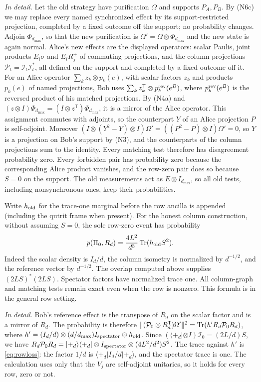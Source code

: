\emph{In detail.} Let the old strategy have purification $\Omega$ and supports $P_A,P_B$. By (N6c) we may replace every named synchronized effect by its support-restricted projection, completed by a fixed outcome off the support; no probability changes. Adjoin $\Phi_{d_{\max}}$, so that the new purification is $\Omega'=\Omega\otimes\Phi_{d_{\max}}$ and the new state is again normal. Alice's new effects are the displayed operators: scalar Paulis, joint products $E_i\sigma$ and $E_iR^\pm_j$ of commuting projections, and the column projections $\mathcal P_t=\mathcal I_t\mathcal I_t^*$, all defined on the support and completed by a fixed outcome off it. For an Alice operator $\sum_kz_k\otimes p_k(e)$, with scalar factors $z_k$ and products $p_k(e)$ of named projections, Bob uses $\sum_kz_k^{\mathsf T}\otimes p^{\rm rev}_k(e^B)$, where $p^{\rm rev}_k(e^B)$ is the reversed product of his matched projections. By (N4a) and $(z\otimes I)\Phi_{d_{\max}}=(I\otimes z^{\mathsf T})\Phi_{d_{\max}}$, it is a mirror of the Alice operator. This assignment commutes with adjoints, so the counterpart $Y$ of an Alice projection $P$ is self-adjoint. Moreover $(I\otimes(Y^2-Y)\otimes I)\Omega'=((P^2-P)\otimes I)\Omega'=0$, so $Y$ is a projection on Bob's support by (N3), and the counterparts of the column projections sum to the identity. Every matching test therefore has disagreement probability zero. Every forbidden pair has probability zero because the corresponding Alice product vanishes, and the row-zero pair does so because $S=0$ on the support. The old measurements act as $E\otimes I_{d_{\max}}$, so all old tests, including nonsynchronous ones, keep their probabilities.


Write $h_{\rm old}$ for the trace-one marginal before the row ancilla is appended (including the qutrit frame when present). For the honest column construction, without assuming $S=0$, the sole row-zero event has probability
\begin{equation}\label{eq:rowloss}
 p(\Pi_0,R_d)=\frac{4L^2}{d^3}\operatorname{Tr}(h_{\rm old}S^2).
\end{equation}
Indeed the scalar density is $I_d/d$, the column isometry is normalized by $d^{-1/2}$, and the reference vector by $d^{-1/2}$. The overlap computed above supplies $(2LS)^*(2LS)$. Spectator factors have normalized trace one. All column-graph and matching tests remain exact even when the row is nonzero. This formula is \cite[Eq.~(32)]{Entropy} in the general row setting.

\emph{In detail.} Bob's reference effect is the transpose of $R_d$ on the scalar factor and is a mirror of $R_d$. The probability is therefore $\|(\mathcal P_0\otimes R_d^{\mathsf T})\Omega'\|^2=\operatorname{Tr}(h'R_d\mathcal P_0R_d)$, where $h'=(I_d/d)\otimes(d/d_{\max})I_{\rm spectator}\otimes h_{\rm old}$. Since $(\langle+_d|\otimes I)\mathcal I_0=(2L/d)S$, we have $R_d\mathcal P_0R_d=|+_d\rangle\langle+_d|\otimes I_{\rm spectator}\otimes(4L^2/d^2)S^2$. The trace against $h'$ is \eqref{eq:rowloss}: the factor $1/d$ is $\langle+_d|I_d/d|+_d\rangle$, and the spectator trace is one. The calculation uses only that the $V_j$ are self-adjoint unitaries, so it holds for every row, zero or not.

